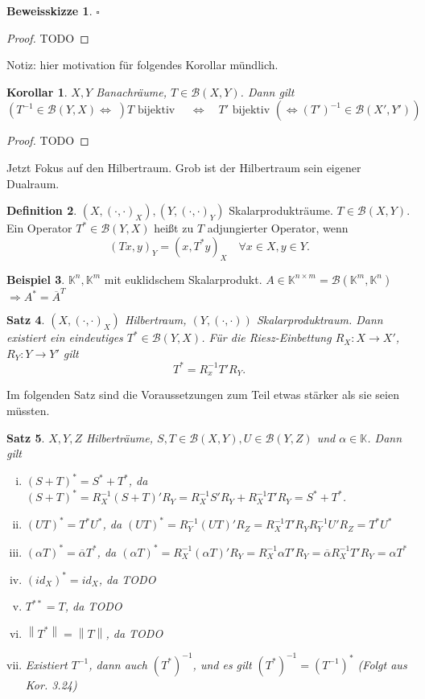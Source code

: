 \documentclass[ngerman]{report}
\theoremstyle{plain}%
\newtheorem{thm}{Satz}[chapter]
\newtheorem{cor}[thm]{Korollar}
\theoremstyle{definition}%
\newtheorem{definition}[thm]{Definition}
\newtheorem{bsp}[thm]{Beispiel}
\theoremstyle{myStyle}
\newtheorem*{proof*}{Beweisskizze}
\newenvironment{hinweise}{\footnotesize \begin{proof*}}{\hfill $\square$ \end{proof*}\normalsize}
\newcommand{\K}{\mathbb{K}}
\newcommand{\B}{\mathcal{B}} %
\newcommand{\BS}[1][X,Y]{\mathcal{B}(#1)} %
\newcommand{\norm}[1]{\left \|#1\right\| }
\newcommand{\df}[1][]{%
	\overset{#1}{\Rightarrow}
}
\newcommand{\aq}{\Leftrightarrow} %
\newcommand{\inv}[1]{#1^{-1}}
\newcommand{\ov}[1]{\overline{#1}}
\newcommand{\SP}{\left (\cdot,\cdot \right)} %
\begin{document}
	\begin{hinweise}

	\end{hinweise}

	\begin{proof}
		TODO
	\end{proof}

	Notiz:  hier motivation für folgendes Korollar mündlich.
	\begin{cor}
		$X, Y$ Banachräume, $T\in \BS$. Dann gilt 
			$$ (\inv{T} \in \B(Y,X) \aq \; ) T \text{ bijektiv } \quad \aq 
				\quad T' \text{ bijektiv } (\aq \inv{(T')} \in \B(X',Y'))$$
	\end{cor}

	\begin{proof}
		TODO
	\end{proof}
	
	Jetzt Fokus auf den Hilbertraum. Grob ist der Hilbertraum sein eigener Dualraum. 
	\begin{definition}
		$(X, \SP_X), (Y, \SP_Y)$ Skalarprodukträume. 
		$T\in \BS$. Ein Operator $T^*\in \B(Y,X)$ heißt zu $T$ adjungierter Operator, wenn 
			$$ (Tx,y)_Y = (x,T^* y)_X \quad \forall x\in X, y\in Y.$$
	\end{definition}

	\begin{bsp}
	 $\K^n, \K^m$ mit euklidschem Skalarprodukt. $A\in \K^{n\times m} = \B(\K^m, \K^n)$
	 $\df A^* = \ov{A}^T$
	\end{bsp}
	
	\begin{thm}
		$(X,\SP_X)$ Hilbertraum, $(Y,\SP)$ Skalarproduktraum. Dann existiert ein eindeutiges $T^* \in \B(Y,X)$. Für die Riesz-Einbettung $R_X : X\to X'$, $R_Y : Y \to Y'$ gilt
			$$ T^* = \inv{R_x} T' R_Y.$$
	\end{thm}
Im folgenden Satz sind die Voraussetzungen zum Teil etwas stärker als sie seien müssten.
	\begin{thm}
		$X,Y,Z$ Hilberträume, $S,T \in \BS, U \in \B(Y,Z)$ und $\alpha \in \K$. Dann gilt
			\begin{enumerate}[(i)]
				\item $(S+T)^* = S^* + T^*$, da $(S+T)^* = \inv{R_X}(S+T)' R_Y = \inv{R_X}S' R_Y + \inv{R_X}T' R_Y = S^* + T^*$.
				\item $(UT)^* = T^* U^*$, da $(UT)^* = \inv{R_Y}(UT)' R_Z = \inv{R_X}T'R_Y \inv{R_Y} U' R_Z = T^* U^*$
				\item $(\alpha T)^* = \ov{\alpha} T^*$, da $(\alpha T)^* = \inv{R_X} (\alpha T)' R_Y = \inv{R_X} \alpha T' R_Y = \ov{\alpha} \inv{R_X} T' R_Y = \alpha T^*$
				\item $(id_X)^* = id_X$, da TODO
				\item $T^{**} = T$, da TODO
				\item $\norm{T^*} = \norm{T}$, da TODO
				\item Existiert $\inv{T}$, dann auch $\inv{(T^*)}$, und es gilt $\inv{(T^*)} = (\inv{T})^*$ (Folgt aus Kor. 3.24)
			\end{enumerate}
	\end{thm}
\end{document}
